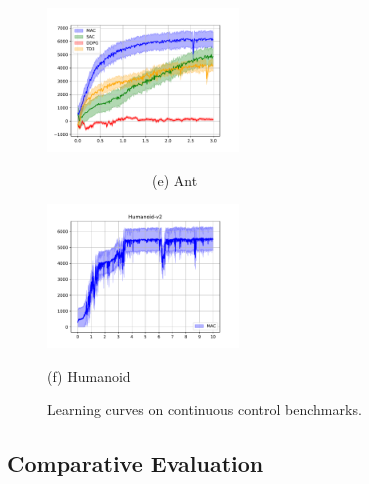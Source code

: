 \begin{figure}[t]
\begin{minipage}{0.5\linewidth}
\raggedleft
\includegraphics[width=2in]{./mujoco-results/Ant-v2-AVE.pdf}
\centerline{\ \ \ \ \ \ \ \ \ \ \ \ \ \ \       (e) Ant }
\end{minipage}%
\begin{minipage}{0.5\linewidth}
\includegraphics[width=2in]{./mujoco-results/Humanoid-v2-AVE.pdf}
\centerline{(f) Humanoid}
\end{minipage}%

\caption{Learning curves on continuous control benchmarks. }
\label{fig:result_mujoco}
\end{figure}

\subsection{Comparative Evaluation}

